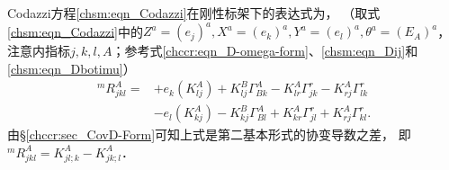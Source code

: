 Codazzi方程\eqref{chsm:eqn_Codazzi}在刚性标架下的表达式为，
（取式\eqref{chsm:eqn_Codazzi}中的$Z^a=(e_j)^a,X^a=(e_k)^a,Y^a=(e_l)^a,\theta^a=(E_A)^a$，
注意内指标$j,k,l,A$；参考式\eqref{chccr:eqn_D-omega-form}、\eqref{chsm:eqn_Dij}和\eqref{chsm:eqn_Dbotimu}）
\begin{equation}\label{chsm:eqn_Codazzi-Frame}
    \begin{aligned}
        {}^{m}{R}^A_{jkl} =& +{e_k} ( K^A_{lj}) + K^B_{lj} \Gamma_{B k}^{A}
        -K^A_{lr} \Gamma_{jk}^{r} - K^A_{rj} \Gamma_{lk}^{r} \\
        &-{e_l} ( K^A_{kj})  - K^B_{kj} \Gamma_{B l}^{A}
        + K^A_{kr} \Gamma_{jl}^{r} +K^A_{rj} \Gamma_{kl}^{r}  .
    \end{aligned}
\end{equation}
由\S \ref{chccr:sec_CovD-Form}可知上式是第二基本形式的协变导数之差，
即${}^{m}{R}^A_{jkl} =K^A_{jl;k}- K^A_{jk;l}$．

